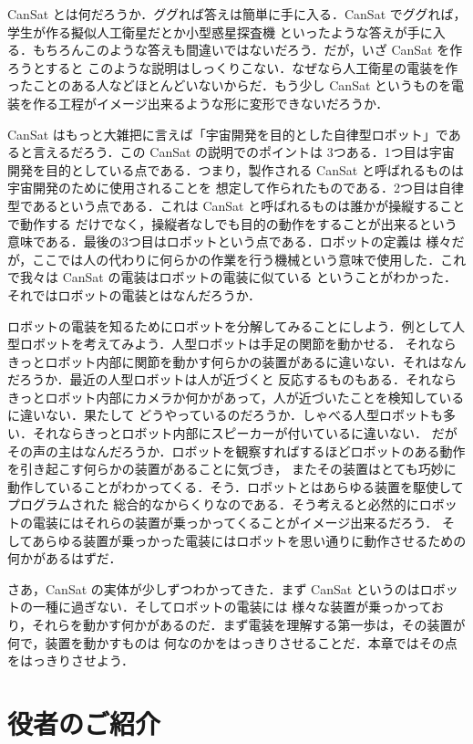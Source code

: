 \documentclass[dvipdfmx]{jsbook}
\begin{document}
  CanSat とは何だろうか．ググれば答えは簡単に手に入る．CanSat でググれば，学生が作る擬似人工衛星だとか小型惑星探査機
  といったような答えが手に入る．もちろんこのような答えも間違いではないだろう．だが，いざ CanSat を作ろうとすると
  このような説明はしっくりこない．なぜなら人工衛星の電装を作ったことのある人などほとんどいないからだ．もう少し CanSat 
  というものを電装を作る工程がイメージ出来るような形に変形できないだろうか．

  CanSat はもっと大雑把に言えば「宇宙開発を目的とした自律型ロボット」であると言えるだろう．この CanSat の説明でのポイントは
  3つある．1つ目は宇宙開発を目的としている点である．つまり，製作される CanSat と呼ばれるものは宇宙開発のために使用されることを
  想定して作られたものである．2つ目は自律型であるという点である．これは CanSat と呼ばれるものは誰かが操縦することで動作する
  だけでなく，操縦者なしでも目的の動作をすることが出来るという意味である．最後の3つ目はロボットという点である．ロボットの定義は
  様々だが，ここでは人の代わりに何らかの作業を行う機械という意味で使用した．これで我々は CanSat の電装はロボットの電装に似ている
  ということがわかった．それではロボットの電装とはなんだろうか．

  ロボットの電装を知るためにロボットを分解してみることにしよう．例として人型ロボットを考えてみよう．人型ロボットは手足の関節を動かせる．
  それならきっとロボット内部に関節を動かす何らかの装置があるに違いない．それはなんだろうか．最近の人型ロボットは人が近づくと
  反応するものもある．それならきっとロボット内部にカメラか何かがあって，人が近づいたことを検知しているに違いない．果たして
  どうやっているのだろうか．しゃべる人型ロボットも多い．それならきっとロボット内部にスピーカーが付いているに違いない．
  だがその声の主はなんだろうか．ロボットを観察すればするほどロボットのある動作を引き起こす何らかの装置があることに気づき，
  またその装置はとても巧妙に動作していることがわかってくる．そう．ロボットとはあらゆる装置を駆使してプログラムされた
  総合的なからくりなのである．そう考えると必然的にロボットの電装にはそれらの装置が乗っかってくることがイメージ出来るだろう．
  そしてあらゆる装置が乗っかった電装にはロボットを思い通りに動作させるための何かがあるはずだ．

  さあ，CanSat の実体が少しずつわかってきた．まず CanSat というのはロボットの一種に過ぎない．そしてロボットの電装には
  様々な装置が乗っかっており，それらを動かす何かがあるのだ．まず電装を理解する第一歩は，その装置が何で，装置を動かすものは
  何なのかをはっきりさせることだ．本章ではその点をはっきりさせよう．

\section{役者のご紹介}
\label{sub:役者のご紹介}
\end{document}
